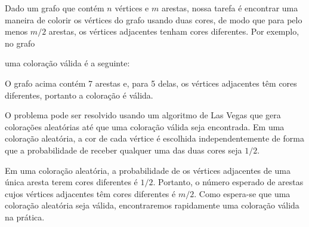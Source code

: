 Dado um grafo que contém $n$ vértices e $m$ arestas,
nossa tarefa é encontrar uma maneira de colorir os vértices
do grafo usando duas cores, de modo que
para pelo menos $m/2$ arestas, os vértices adjacentes
tenham cores diferentes.
Por exemplo, no grafo
\begin{center}
\end{center}
uma coloração válida é a seguinte:
\begin{center}
\end{center}
O grafo acima contém 7 arestas e, para 5 delas,
os vértices adjacentes têm cores diferentes,
portanto a coloração é válida.

O problema pode ser resolvido usando um algoritmo de Las Vegas
que gera colorações aleatórias até que uma coloração válida
seja encontrada.
Em uma coloração aleatória, a cor de cada vértice é
escolhida independentemente de forma que a probabilidade de receber
qualquer uma das duas cores seja $1/2$.

Em uma coloração aleatória, a probabilidade de os vértices adjacentes
de uma única aresta terem cores diferentes é $1/2$.
Portanto, o número esperado de arestas cujos vértices adjacentes
têm cores diferentes é $m/2$.
Como espera-se que uma coloração aleatória seja válida,
encontraremos rapidamente uma coloração válida na prática.

